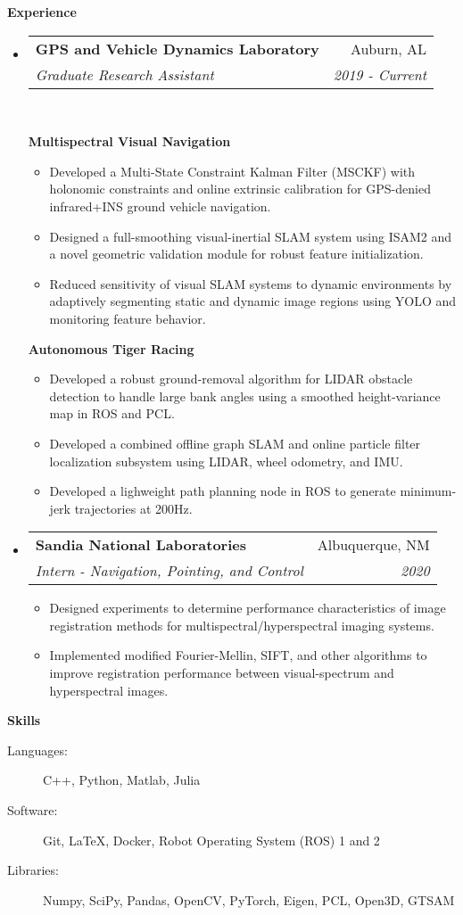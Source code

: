 \documentclass[letterpaper,11pt]{article}
\makeatletter
\newcommand{\resitem}[1]{\item #1 \vspace{-2pt}}
\newcommand{\resheading}[1]{\vspace{10pt} \Large \textbf{#1} \normalsize}
\newcommand{\ressubheading}[4]{
\begin{tabular*}{6.5in}{l@{\extracolsep{\fill}}r}
		\large \textbf{#1} \normalsize & #2 \\
		\textit{#3} & \textit{#4} \\
\end{tabular*}\vspace{-5pt}}
\makeatother
\begin{document}
\resheading{Experience}
\begin{itemize}

\item
	\ressubheading{GPS and Vehicle Dynamics Laboratory}{Auburn, AL}{Graduate Research Assistant}{2019 - Current}\\
	\vspace{10pt}

	\large \textbf{Multispectral Visual Navigation} \normalsize
	\vspace{-5pt}
	\begin{itemize}
		\resitem{Developed a Multi-State Constraint Kalman Filter (MSCKF) with holonomic constraints and online extrinsic calibration for GPS-denied infrared+INS ground vehicle navigation.}
		\resitem{Designed a full-smoothing visual-inertial SLAM system using ISAM2 and a novel geometric validation module for robust feature initialization.}
		\resitem{Reduced sensitivity of visual SLAM systems to dynamic environments by adaptively segmenting static and dynamic image regions using YOLO and monitoring feature behavior.}
	\end{itemize}

	\large \textbf{Autonomous Tiger Racing} \normalsize
	\vspace{-5pt}
	\begin{itemize}
		\resitem{Developed a robust ground-removal algorithm for LIDAR obstacle detection to handle large bank angles using a smoothed height-variance map in ROS and PCL.}
		\resitem{Developed a combined offline graph SLAM and online particle filter localization subsystem using LIDAR, wheel odometry, and IMU.}
		\resitem{Developed a lighweight path planning node in ROS to generate minimum-jerk trajectories at 200Hz.}
	\end{itemize}

\item
	\ressubheading{Sandia National Laboratories}{Albuquerque, NM}{Intern - Navigation, Pointing, and Control}{2020}
	\begin{itemize}
		\item Designed experiments to determine performance characteristics of image registration methods for multispectral/hyperspectral imaging systems.
		\item Implemented modified Fourier-Mellin, SIFT, and other algorithms to improve registration performance between visual-spectrum and hyperspectral images.
	\end{itemize}

\end{itemize}

\resheading{Skills}

\begin{description}
\item[Languages:]
C++, Python, Matlab, Julia
\item[Software:]
Git, \LaTeX, Docker, Robot Operating System (ROS) 1 and 2
\item[Libraries:]
Numpy, SciPy, Pandas, OpenCV, PyTorch, Eigen, PCL, Open3D, GTSAM
\end{description}
\end{document}
